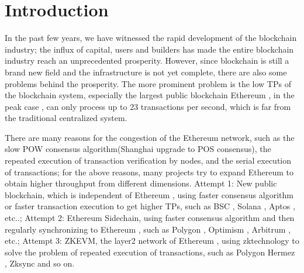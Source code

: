 \section{Introduction}\label{sec:introduction}

In the past few years, we have witnessed the rapid development of the blockchain industry; 
the influx of capital, users and builders has made the entire blockchain industry reach 
an unprecedented prosperity. However, since blockchain is still a brand new field and the
infrastructure is not yet complete, there are also some problems behind the prosperity. 
The more prominent problem is the low TPs of the blockchain system, especially the largest public
blockchain Ethereum \cite{website:Ethereum}, in the peak case \cite{website:Etherscan-chart}, can only process up to 23 
transactions per second, which is far from the traditional centralized system. 

There are many reasons for the congestion of the Ethereum \cite{website:Ethereum} network, such as the slow POW \cite{website:POW} 
consensus algorithm(Shanghai upgrade \cite{website:Shanghai-upgrade} to POS \cite{website:POS} consensus), the repeated execution of 
transaction verification by nodes, and the serial execution of transactions; 
for the above reasons, many projects try to expand Ethereum to obtain higher throughput from different dimensions. Attempt 1: New public blockchain, 
which is independent of Ethereum \cite{website:Ethereum}, 
using faster consensus algorithm or faster transaction execution to get higher TPs, such as BSC \cite{website:BSC}, Solana \cite{website:Solana}, 
Aptos \cite{website:Aptos}, etc..; Attempt 2: Ethereum \cite{website:Ethereum} Sidechain, using faster consensus
algorithm and then regularly synchronizing to Ethereum \cite{website:Ethereum}, such as Polygon \cite{website:Polygon}, Optimism \cite{website:Optimism}, Arbitrum \cite{website:Arbitrum},
etc.; Attempt 3: ZKEVM, the layer2 network of Ethereum \cite{website:Ethereum}, using zktechnology to 
solve the problem of repeated execution of transactions, such as Polygon Hermez \cite{website:Polygon-Hermez}, 
Zksync \cite{website:Zksync} and so on.

